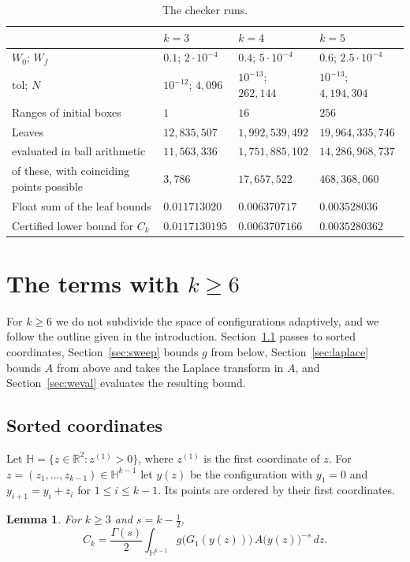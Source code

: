 \documentclass[11pt]{amsart}
\newtheorem{lemma}[theorem]{Lemma}
\theoremstyle{definition}
\theoremstyle{remark}
\numberwithin{equation}{section}
\newcommand{\R}{\mathbb{R}}
\newcommand{\CThree}{0.0117130195}
\newcommand{\CFour}{0.0063707166}
\newcommand{\CFive}{0.0035280362}
\newcommand{\WThree}{$0.1$; $2\cdot10^{-4}$}
\newcommand{\WFour}{$0.4$; $5\cdot10^{-4}$}
\newcommand{\WFive}{$0.6$; $2.5\cdot10^{-4}$}
\newcommand{\EpsThree}{$10^{-12}$; $4{,}096$}
\newcommand{\EpsFour}{$10^{-13}$; $262{,}144$}
\newcommand{\EpsFive}{$10^{-13}$; $4{,}194{,}304$}
\newcommand{\RangesThree}{$1$}
\newcommand{\RangesFour}{$16$}
\newcommand{\RangesFive}{$256$}
\newcommand{\LeavesThree}{$12{,}835{,}507$}
\newcommand{\LeavesFour}{$1{,}992{,}539{,}492$}
\newcommand{\LeavesFive}{$19{,}964{,}335{,}746$}
\newcommand{\EvalThree}{$11{,}563{,}336$}
\newcommand{\EvalFour}{$1{,}751{,}885{,}102$}
\newcommand{\EvalFive}{$14{,}286{,}968{,}737$}
\newcommand{\CoinThree}{$3{,}786$}
\newcommand{\CoinFour}{$17{,}657{,}522$}
\newcommand{\CoinFive}{$468{,}368{,}060$}
\newcommand{\FltThree}{$0.011713020$}
\newcommand{\FltFour}{$0.006370717$}
\newcommand{\FltFive}{$0.003528036$}
\begin{document}
\begin{table}[ht]
\centering
\caption{The checker runs.}\label{tab:runs}
\small
\begin{tabular}{@{}llll@{}}
\toprule
& $k=3$ & $k=4$ & $k=5$\\
\midrule
$W_0$; $W_f$ & \WThree & \WFour & \WFive\\
$\mathrm{tol}$; $N$ & \EpsThree & \EpsFour & \EpsFive\\
Ranges of initial boxes & \RangesThree & \RangesFour & \RangesFive\\
Leaves & \LeavesThree & \LeavesFour & \LeavesFive\\
\quad evaluated in ball arithmetic & \EvalThree & \EvalFour & \EvalFive\\
\qquad of these, with coinciding points possible & \CoinThree & \CoinFour & \CoinFive\\
Float sum of the leaf bounds & \FltThree & \FltFour & \FltFive\\
Certified lower bound for $C_k$ & $\CThree$ & $\CFour$ & $\CFive$\\
\bottomrule
\end{tabular}
\end{table}

\section{The terms with \texorpdfstring{$k\ge6$}{k >= 6}}\label{sec:large}

For $k\ge6$ we do not subdivide the space of configurations adaptively, and we follow the outline given in the introduction. Section~\ref{sec:sorted} passes to sorted coordinates, Section~\ref{sec:sweep} bounds $g$ from below, Section~\ref{sec:laplace} bounds $A$ from above and takes the Laplace transform in $A$, and Section~\ref{sec:weval} evaluates the resulting bound.

\subsection{Sorted coordinates}\label{sec:sorted}
Let $\mathbb H=\{z\in\R^2:z^{(1)}>0\}$, where $z^{(1)}$ is the first coordinate of $z$. For $z=(z_1,\dots,z_{k-1})\in\mathbb H^{k-1}$ let $y(z)$ be the configuration with $y_1=0$ and $y_{i+1}=y_i+z_i$ for $1\le i\le k-1$. Its points are ordered by their first coordinates.

\begin{lemma}\label{lem:sorted}
For $k\ge3$ and $s=k-\frac12$,
\[
C_k=\frac{\Gamma(s)}2\int_{\mathbb H^{k-1}}g\bigl(G_1(y(z))\bigr)\,A\bigl(y(z)\bigr)^{-s}\,dz.
\]
\end{lemma}
\end{document}
